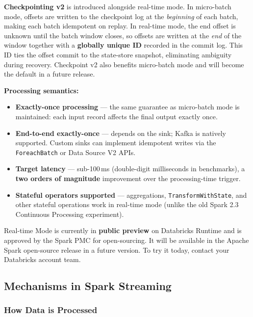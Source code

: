 \textbf{Checkpointing v2} is introduced alongside real-time mode.
In micro-batch mode, offsets are written to the checkpoint log at the \emph{beginning} of each batch,
making each batch idempotent on replay.
In real-time mode, the end offset is unknown until the batch window closes,
so offsets are written at the \emph{end} of the window together with a \textbf{globally unique ID}
recorded in the commit log.
This ID ties the offset commit to the state-store snapshot, eliminating ambiguity during recovery.
Checkpoint v2 also benefits micro-batch mode and will become the default in a future release.

\textbf{Processing semantics:}
\begin{itemize}
  \item \textbf{Exactly-once processing} — the same guarantee as micro-batch mode is maintained:
        each input record affects the final output exactly once.
  \item \textbf{End-to-end exactly-once} — depends on the sink; Kafka is natively supported.
        Custom sinks can implement idempotent writes via the \texttt{ForeachBatch} or Data Source V2 APIs.
  \item \textbf{Target latency} — sub-100\,ms (double-digit milliseconds in benchmarks),
        a \textbf{two orders of magnitude} improvement over the processing-time trigger.
  \item \textbf{Stateful operators supported} — aggregations, \texttt{TransformWithState}, and other
        stateful operations work in real-time mode (unlike the old Spark 2.3 Continuous Processing experiment).
\end{itemize}

\begin{tcolorbox}[colback=NavyBlue!6, colframe=NavyBlue, title=\textbf{Availability}]
Real-time Mode is currently in \textbf{public preview} on Databricks Runtime and is approved
by the Spark PMC for open-sourcing.
It will be available in the Apache Spark open-source release in a future version.
To try it today, contact your Databricks account team.
\end{tcolorbox}

\subsection{Mechanisms in Spark Streaming}

\subsubsection{How Data is Processed}

